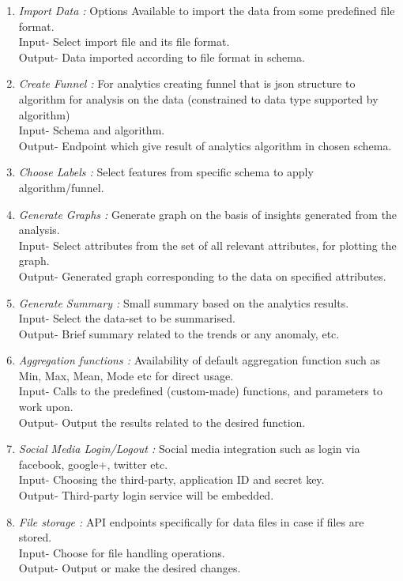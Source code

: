 \documentclass[a4paper,12pt]{report}
\begin{document}
\begin{enumerate}
{        Input- Select schema or info to export and file format.\\
        Output- Export data in standard file format eg csv, xml, json etc.  
      }
      \item {\emph {Import Data :}  Options Available to import the data from some predefined file format. \\
        Input- Select import file and its file format. \\
        Output- Data imported according to file format in schema.
      }
      \item {\emph {Create Funnel :}   For analytics creating funnel that is json structure to algorithm for analysis on the data (constrained to data type supported by algorithm) \\
        Input- Schema and algorithm. \\
        Output- Endpoint which give result of analytics algorithm in chosen schema.  
      }
      \item { \emph {Choose Labels :} Select features from specific schema to apply algorithm/funnel. }
      \item {\emph {Generate Graphs :}   Generate graph on the basis of insights generated from the analysis. \\
        Input- Select attributes from the set of all relevant attributes, for plotting the graph.\\
        Output- Generated graph corresponding to the data on specified attributes.
      }
      \item {\emph {Generate Summary :}    Small summary based on the analytics results. \\
      Input- Select the data-set to be summarised.\\
      Output- Brief summary related to the trends or any anomaly, etc.
      }
      \item {\emph {Aggregation functions :} Availability of default aggregation function such as Min, Max, Mean, Mode etc for direct usage. \\
        Input- Calls to the predefined (custom-made) functions, and parameters to work upon. \\
        Output- Output the results related to the desired function.
      }
      \item {\emph {Social Media Login/Logout :} Social media integration such as login via facebook, google+, twitter etc. \\
        Input- Choosing the third-party, application ID and secret key. \\
        Output- Third-party login service will be embedded.
      }
      \item {\emph {File storage : } API endpoints specifically for data files in case if files are stored. \\
        Input- Choose for file handling operations. \\
        Output- Output or make the desired changes.
      }
      \end{enumerate}
\end{document}
